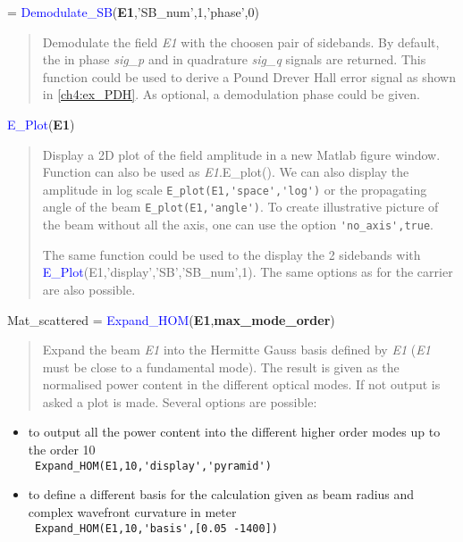  = \textcolor{blue}{Demodulate\_SB}(\textbf{E1},'SB\_num',1,'phase',0)
\vspace*{-0.2cm}
\begin{quote}
Demodulate the field \textsl{E1} with the choosen pair of sidebands. By default, the in phase \textsl{sig\_p} and in quadrature \textsl{sig\_q} signals are returned. This function could be used to derive a Pound Drever Hall error signal as shown in \ref{ch4:ex_PDH}. As optional, a demodulation phase could be given.
\end{quote}

\noindent \textcolor{blue}{E\_Plot}(\textbf{E1})
\vspace*{-0.2cm}
\begin{quote}
Display a 2D plot of the field amplitude in a new Matlab figure window. Function can also be used as \textsl{E1}.E\_plot(). We can also display the amplitude in log scale \verb?E_plot(E1,'space','log')? or the propagating angle of the beam \verb?E_plot(E1,'angle')?. To create illustrative picture of the beam without all the axis, one can use the option \verb?'no_axis',true?.

The same function could be used to the display the 2 sidebands with \textcolor{blue}{E\_Plot}(E1,'display','SB','SB\_num',1). The same options as for the carrier are also possible.
\end{quote}


\noindent Mat\_scattered = \textcolor{blue}{Expand\_HOM}(\textbf{E1},\textbf{max\_mode\_order})
\vspace*{-0.2cm}
\begin{quote}
Expand the beam \textsl{E1} into the Hermitte Gauss basis defined by \textsl{E1} (\textsl{E1} must be close to a fundamental mode). The result is given as the normalised power content in the different optical modes. If not output is asked a plot is made. Several options are possible:
\end{quote}
\begin{itemize}
  \item to output all the power content into the different higher order modes up to the order 10 \\
        \verb? Expand_HOM(E1,10,'display','pyramid') ?
  \item to define a different basis for the calculation given as beam radius and complex wavefront curvature in meter\\
        \verb? Expand_HOM(E1,10,'basis',[0.05 -1400]) ?
\end{itemize}

